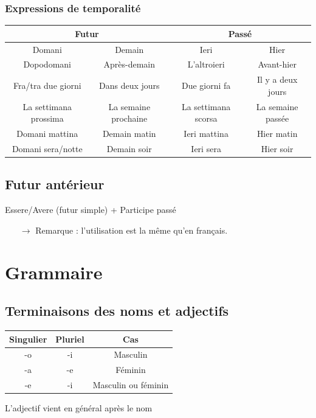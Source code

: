 \documentclass[12pt, openany]{report}
\begin{document}
\subsection{Expressions de temporalité}
\begin{center}
    \begin{tabular}{c|c|c|c}
        \multicolumn{2}{c|}{\textbf{Futur}} & \multicolumn{2}{c}{\textbf{Passé}} \\ \hline
        Domani & Demain & Ieri & Hier \\
        Dopodomani & Après-demain & L'altroieri & Avant-hier \\
        Fra/tra due giorni & Dans deux jours & Due giorni fa & Il y a deux jours \\
        La settimana prossima & La semaine prochaine & La settimana scorsa & La semaine passée \\
        Domani mattina & Demain matin & Ieri mattina & Hier matin \\
        Domani sera/notte & Demain soir & Ieri sera & Hier soir \\
    \end{tabular}
\end{center}
\section{Futur antérieur}
\begin{center}
    Essere/Avere (futur simple) + Participe passé 
\end{center}
\begin{itemize}
    \item [$\to$] Remarque : l'utilisation est la même qu'en français.
\end{itemize}
\chapter{Grammaire}
\section{Terminaisons des noms et adjectifs}
\begin{center}
    \begin{tabular}{c|c|c}
        Singulier & Pluriel & Cas\\
        \hline
        -o & -i & Masculin \\
        -a & -e & Féminin \\
        -e & -i & Masculin ou féminin\\
    \end{tabular}
\end{center}
L'adjectif vient en général après le nom 
\end{document}
